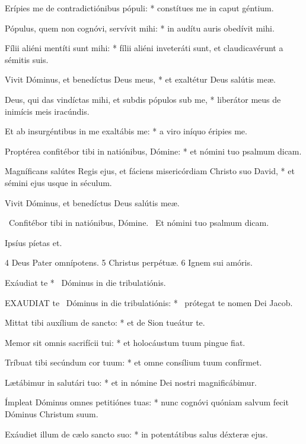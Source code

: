 Erípies me de contradictiónibus pópuli: * constítues me in caput géntium.

Pópulus, quem non cognóvi, servívit mihi: * in audítu auris obedívit mihi.

Fílii aliéni mentíti sunt mihi: * fílii aliéni inveteráti sunt, et claudicavérunt a sémitis suis.

Vivit Dóminus, et benedíctus Deus meus, * et exaltétur Deus salútis meæ.

Deus, qui das vindíctas mihi, et subdis pópulos sub me, * liberátor meus de inimícis meis iracúndis.

Et ab insurgéntibus in me exaltábis me: * a viro iníquo éripies me.

Proptérea confitébor tibi in natiónibus, Dómine: * et nómini tuo psalmum dicam.

Magníficans salútes Regis ejus, et fáciens misericórdiam Christo suo David, * et sémini ejus usque in séculum.

 Vivit Dóminus, et benedíctus Deus salútis meæ.


\V\ Confitébor tibi in natiónibus, Dómine. \R\ Et nómini tuo psalmum dicam.

 Ipsíus píetas et.

 4 Deus Pater omnípotens. 5 Christus perpétuæ. 6 Ignem sui amóris.


 Exáudiat te * \textdagger\ Dóminus in die tribulatiónis. \textdagger


\lettrine[lines=2]{E}{XAUDIAT} te \textdagger\ Dóminus in die tribulatiónis: * \textdagger\ prótegat te nomen Dei Jacob.

Mittat tibi auxílium de sancto: * et de Sion tueátur te.

Memor sit omnis sacrifícii tui: * et holocáustum tuum pingue fiat.

Tríbuat tibi secúndum cor tuum: * et omne consílium tuum confírmet.

Lætábimur in salutári tuo: * et in nómine Dei nostri magnificábimur.

Ímpleat Dóminus omnes petitiónes tuas: * nunc cognóvi quóniam salvum fecit Dóminus Christum suum.

Exáudiet illum de cælo sancto suo: * in potentátibus salus déxteræ ejus.

